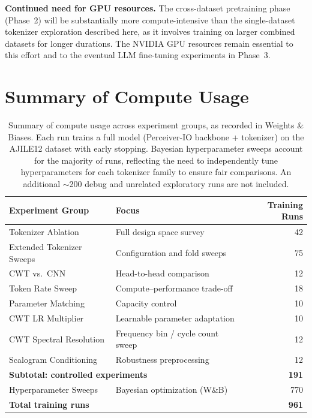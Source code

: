 \documentclass[11pt, a4paper]{article}
\begin{document}
\textbf{Continued need for GPU resources.} The cross-dataset pretraining phase (Phase~2) will be substantially more compute-intensive than the single-dataset tokenizer exploration described here, as it involves training on larger combined datasets for longer durations. The NVIDIA GPU resources remain essential to this effort and to the eventual LLM fine-tuning experiments in Phase~3.


\section{Summary of Compute Usage}
\label{sec:compute}

\begin{table}[H]
    \centering
    \begin{tabular}{llr}
        \toprule
        \textbf{Experiment Group} & \textbf{Focus} & \textbf{Training Runs} \\
        \midrule
        Tokenizer Ablation        & Full design space survey           & 42 \\
        Extended Tokenizer Sweeps & Configuration and fold sweeps      & 75 \\
        CWT vs.\ CNN              & Head-to-head comparison            & 12 \\
        Token Rate Sweep          & Compute--performance trade-off     & 18 \\
        Parameter Matching        & Capacity control                   & 10 \\
        CWT LR Multiplier         & Learnable parameter adaptation     & 10 \\
        CWT Spectral Resolution   & Frequency bin / cycle count sweep  & 12 \\
        Scalogram Conditioning    & Robustness preprocessing           & 12 \\
        \midrule
        \multicolumn{2}{l}{\textbf{Subtotal: controlled experiments}} & \textbf{191} \\
        \midrule
        Hyperparameter Sweeps     & Bayesian optimization (W\&B)       & 770 \\
        \midrule
        \multicolumn{2}{l}{\textbf{Total training runs}} & \textbf{961} \\
        \bottomrule
    \end{tabular}
    \caption{Summary of compute usage across experiment groups, as recorded in Weights \& Biases.  Each run trains a full model (Perceiver-IO backbone + tokenizer) on the AJILE12 dataset with early stopping.  Bayesian hyperparameter sweeps account for the majority of runs, reflecting the need to independently tune hyperparameters for each tokenizer family to ensure fair comparisons.  An additional $\sim$200 debug and unrelated exploratory runs are not included.}
    \label{tab:compute}
\end{table}
\end{document}
